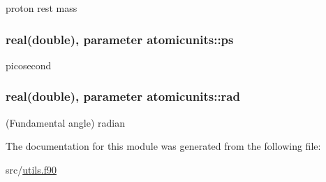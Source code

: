 proton rest mass 

\hypertarget{classatomicunits_af5dac3bb123ac05a538d6ebd2373eb3b}{
\subsubsection[{ps}]{\setlength{\rightskip}{0pt plus 5cm}real(double), parameter atomicunits\+::ps}}\label{classatomicunits_af5dac3bb123ac05a538d6ebd2373eb3b}


picosecond 

\hypertarget{classatomicunits_a07ac069b1a5417fd61aa3954d6b66d83}{
\subsubsection[{rad}]{\setlength{\rightskip}{0pt plus 5cm}real(double), parameter atomicunits\+::rad}}\label{classatomicunits_a07ac069b1a5417fd61aa3954d6b66d83}


(Fundamental angle) radian 



The documentation for this module was generated from the following file\+:\begin{DoxyCompactItemize}
\item 
src/\hyperlink{utils_8f90}{utils.\+f90}\end{DoxyCompactItemize}
